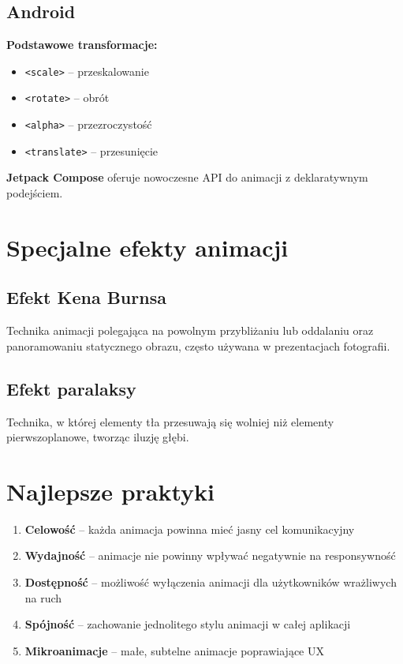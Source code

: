 \subsection{Android}
\textbf{Podstawowe transformacje:}
\begin{itemize}[itemsep=0pt]
    \item \texttt{<scale>} -- przeskalowanie
    \item \texttt{<rotate>} -- obrót
    \item \texttt{<alpha>} -- przezroczystość
    \item \texttt{<translate>} -- przesunięcie
\end{itemize}

\textbf{Jetpack Compose} oferuje nowoczesne API do animacji z deklaratywnym podejściem.

\section{Specjalne efekty animacji}

\subsection{Efekt Kena Burnsa}
Technika animacji polegająca na powolnym przybliżaniu lub oddalaniu oraz panoramowaniu statycznego obrazu, często używana w prezentacjach fotografii.

\subsection{Efekt paralaksy}
Technika, w której elementy tła przesuwają się wolniej niż elementy pierwszoplanowe, tworząc iluzję głębi.

\section{Najlepsze praktyki}
\begin{enumerate}
    \item \textbf{Celowość} -- każda animacja powinna mieć jasny cel komunikacyjny
    \item \textbf{Wydajność} -- animacje nie powinny wpływać negatywnie na responsywność
    \item \textbf{Dostępność} -- możliwość wyłączenia animacji dla użytkowników wrażliwych na ruch
    \item \textbf{Spójność} -- zachowanie jednolitego stylu animacji w całej aplikacji
    \item \textbf{Mikroanimacje} -- małe, subtelne animacje poprawiające UX
\end{enumerate}

